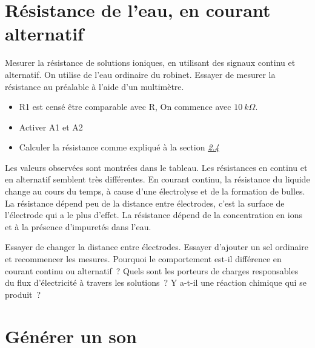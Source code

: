 \documentclass[a4paper,12pt,french]{sphinxmanual}
\let\sphinxpxdimen\pdfpxdimen\else\newdimen\sphinxpxdimen
\begin{document}
\section{Résistance de l’eau, en courant alternatif}
\label{\detokenize{2.18:resistance-de-leau-en-courant-alternatif}}\label{\detokenize{2.18::doc}}

Mesurer la résistance de solutions ioniques, en utilisant des signaux
continu et alternatif. On utilise de l’eau ordinaire du robinet. Essayer
de mesurer la résistance au préalable à l’aide d’un
multimètre.

\noindent\sphinxincludegraphics[width=300\sphinxpxdimen]{{res-water}.pdf}
\noindent\sphinxincludegraphics[width=300\sphinxpxdimen]{{water-conduct}.pdf}

\begin{itemize}
\item {} 
R1 est censé être comparable avec R, On commence avec \(10~k\Omega\).

\item {} 
Activer A1 et A2

\item {} 
Calculer la résistance comme expliqué à la section
{\hyperref[\detokenize{2.18:sec:Measure-resistance-by-comparison}]{\emph{2.4}}}

\end{itemize}


Les valeurs observées sont montrées dans le tableau. Les résistances en
continu et en alternatif semblent très différentes. En courant continu,
la résistance du liquide change au cours du temps, à cause d’une
électrolyse et de la formation de bulles. La résistance dépend peu de la
distance entre électrodes, c’est la surface de l’électrode qui a le plus
d’effet. La résistance dépend de la concentration en ions et à la
présence d’impuretés dans l’eau.

Essayer de changer la distance entre électrodes. Essayer d’ajouter un
sel ordinaire et recommencer les mesures. Pourquoi le comportement
est-il différence en courant continu ou alternatif ? Quels sont les
porteurs de charges responsables du flux d’électricité à travers les
solutions ? Y a-t-il une réaction chimique qui se produit ?


\section{Générer un son}
\label{\detokenize{2.19:generer-un-son}}\label{\detokenize{2.19::doc}}
\end{document}

